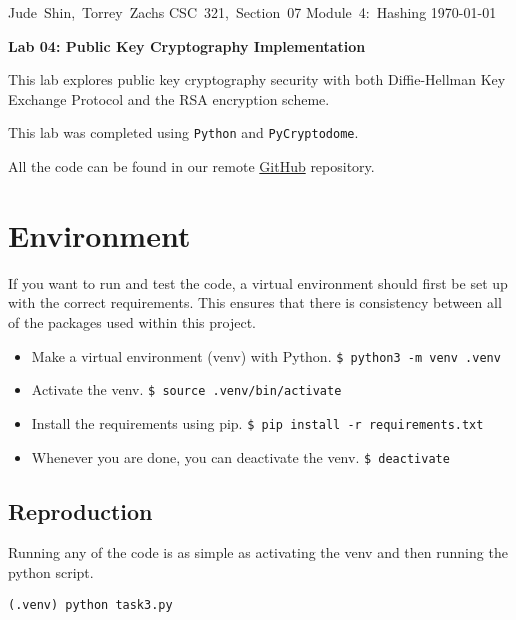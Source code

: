 \documentclass[11pt]{article}
\begin{document}
\hfill\vbox{\hbox{Jude Shin, Torrey Zachs}
		\hbox{CSC 321, Section 07}	
		\hbox{Module 4: Hashing}	
		\hbox{\today}}\par

\bigskip
\centerline{\Large\bf Lab 04: Public Key Cryptography Implementation}\par
\bigskip

This lab explores public key cryptography security with both Diffie-Hellman Key Exchange Protocol and the RSA encryption scheme. 

This lab was completed using {\tt Python} and {\tt PyCryptodome}. 

All the code can be found in our remote \href{https://github.com/jude-shin/CSC\_321}{GitHub} repository.

\section*{Environment}

If you want to run and test the code, a virtual environment should first be set up with the correct requirements. This ensures that there is consistency between all of the packages used within this project.

\begin{itemize}
	\item Make a virtual environment (venv) with Python.
		\verb|$ python3 -m venv .venv|
	\item Activate the venv.
		\verb|$ source .venv/bin/activate|
	\item Install the requirements using pip.
		\verb|$ pip install -r requirements.txt|
	\item Whenever you are done, you can deactivate the venv.
		\verb|$ deactivate|
\end{itemize}

\subsection*{Reproduction}

Running any of the code is as simple as activating the venv and then running the python script.

\verb|(.venv) python task3.py|

\section*{}
\end{document}
